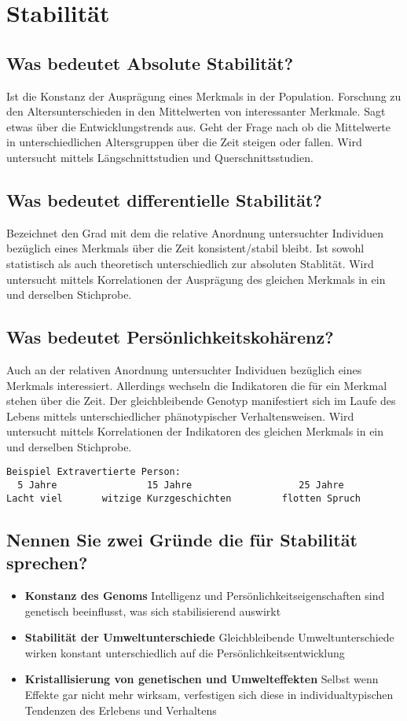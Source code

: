\documentclass[a6paper,9pt,DIV=14]{scrartcl}
\begin{document}
\section{Stabilität}
\subsection{Was bedeutet Absolute Stabilität?} %
Ist die Konstanz der Ausprägung eines Merkmals in der Population. Forschung zu den Altersunterschieden in den Mittelwerten von interessanter Merkmale. Sagt etwas über die Entwicklungstrends aus. Geht der Frage nach ob die Mittelwerte in unterschiedlichen Altersgruppen über die Zeit steigen oder fallen. Wird untersucht mittels Längschnittstudien und Querschnittsstudien.
\subsection{Was bedeutet differentielle Stabilität?} %
Bezeichnet den Grad mit dem die relative Anordnung untersuchter Individuen bezüglich eines Merkmals über die Zeit konsistent/stabil bleibt. Ist sowohl statistisch als auch theoretisch unterschiedlich zur absoluten Stablität. Wird untersucht mittels Korrelationen der Ausprägung des gleichen Merkmals in ein und derselben Stichprobe.
\subsection{Was bedeutet Persönlichkeitskohärenz?}
Auch an der relativen Anordnung untersuchter Individuen bezüglich eines Merkmals interessiert. Allerdings wechseln die Indikatoren die für ein Merkmal stehen über die Zeit. Der gleichbleibende Genotyp manifestiert sich im Laufe des Lebens mittels unterschiedlicher phänotypischer Verhaltensweisen. Wird untersucht mittels Korrelationen der Indikatoren des gleichen Merkmals in ein und derselben Stichprobe.
\begin{Verbatim}[samepage=true, frame=single]
Beispiel Extravertierte Person:
  5 Jahre                15 Jahre                   25 Jahre
Lacht viel       witzige Kurzgeschichten         flotten Spruch
\end{Verbatim}
\subsection{Nennen Sie zwei Gründe die für Stabilität sprechen?}
\begin{itemize}
    \item \textbf{Konstanz des Genoms}
    Intelligenz und Persönlichkeitseigenschaften sind genetisch beeinflusst, was sich
    stabilisierend auswirkt
    \item \textbf{Stabilität der Umweltunterschiede}
    Gleichbleibende Umweltunterschiede wirken konstant unterschiedlich auf die
    Persönlichkeitsentwicklung
    \item \textbf{Kristallisierung von genetischen und Umwelteffekten}
    Selbst wenn Effekte gar nicht mehr wirksam, verfestigen sich diese in individualtypischen
    Tendenzen des Erlebens und Verhaltens
\end{itemize}
\end{document}
